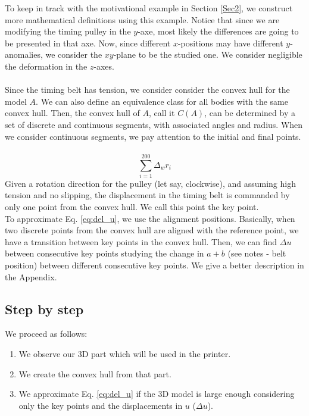 \documentclass[conference]{IEEEtran}
\begin{document}
To keep in track with the motivational example in Section \ref{Sec2}, we construct more mathematical definitions using this example. Notice that since we are modifying the timing pulley in the $y$-axe, most likely the differences are going to be presented in that axe. Now, since different $x$-positions may have different $y$-anomalies, we consider the $xy$-plane to be the studied one. We consider negligible the deformation in the $z$-axes.\\
\quad\\
Since the timing belt has tension, we consider consider the convex hull for the model $A$. We can also define an equivalence class for all bodies with the same convex hull. Then, the convex hull of $A$, call it $C(A)$, can be determined by a set of discrete and continuous segments, with associated angles and radius. When we consider continuous segments, we pay attention to the initial and final points.\\
\quad\\
\begin{equation}
\sum_{i=1}^{200}\Delta_wr_i
\label{eq:del_u}
\end{equation}
Given a rotation direction for the pulley (let say, clockwise), and assuming high tension and no slipping, the displacement in the timing belt is commanded by only one point from the convex hull. We call this point the key point.\\
To approximate Eq. \ref{eq:del_u}, we use the alignment positions. Basically, when two discrete points from the convex hull are aligned with the reference point, we have a transition between key points in the convex hull. Then, we can find $\Delta u$ between consecutive key points studying the change in $a+b$ (see notes - belt position) between different consecutive key points. We give a better description in the Appendix.

\subsection{Step by step}

We proceed as follows:
\begin{enumerate}

\item We observe our 3D part which will be used in the printer.
\item We create the convex hull from that part.
\item We approximate Eq. \ref{eq:del_u} if the 3D model is large enough considering only the key points and the displacements in $u$ ($\Delta u$).

\end{enumerate}
\end{document}
